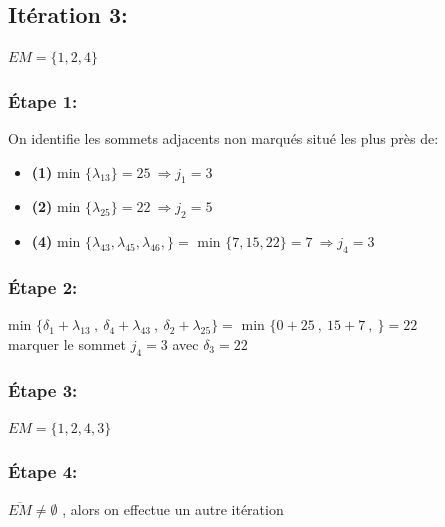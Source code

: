 \documentclass{article}
\begin{document}
\pagebreak 

\subsection*{Itération 3:}
$EM = \{1,2,4\}$
\subsubsection*{Étape 1:}
On identifie les sommets adjacents non marqués situé les plus près de:
\begin{itemize}
    \item \textbf{(1)} min $\{\lambda_{13}\}=25 \: \Rightarrow j_1 =3$ \\
    \item \textbf{(2)} min $\{\lambda_{25}\}=22 \: \Rightarrow j_2 =5$ \\
    \item \textbf{(4)} min $\{\lambda_{43},\lambda_{45},\lambda_{46},\}=$ min $\{7,15,22\}=7 \: \Rightarrow j_4 =3$ \\
\end{itemize}
\subsubsection*{Étape 2:}
min $\{ \delta_1 + \lambda_{13}\: , \:\delta_4+\lambda_{43} \: ,\:\delta_2+\lambda_{25}\} = $ min $\{0+25 \:,\:15+7 \:,\:\}=22 $\\
marquer le sommet $j_4=3$ avec $\delta_3=22$\\ 
\subsubsection*{Étape 3:}
$EM=\{1,2,4,3\}$
\subsubsection*{Étape 4:}
$\overline{EM} \neq \emptyset $ , alors on effectue un autre itération
\end{document}
